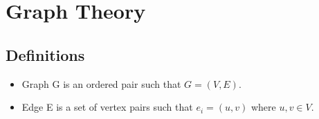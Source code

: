 \chapter{Graph Theory}
\newpage

\section{Definitions}
\begin{itemize}
	\item Graph G is an ordered pair such that $G = (V,E)$.
	\item Edge E is a set of vertex pairs such that $e_i = (u,v)$ where $u,v \in V$.
\end{itemize}
\newpage


\newpage


\newpage


\newpage


\newpage


\newpage


\newpage